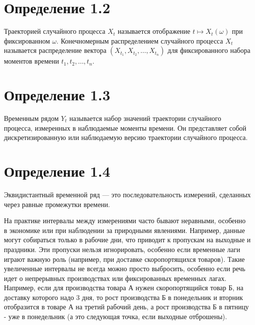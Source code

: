 \section*{Определение 1.2}
Траекторией случайного процесса \( X_t \)
называется отображение \( t \mapsto X_t(\omega) \) при
фиксированном \( \omega \).
Конечномерным распределением случайного процесса \( X_t \)
называется распределение вектора \( (X_{t_1}, X_{t_2}, \ldots,
X_{t_n}) \) для фиксированного набора моментов
времени \( t_1, t_2, \ldots, t_n \).

\section*{Определение 1.3} Временным рядом \( Y_t \) называется
набор значений траектории случайного процесса,
измеренных в наблюдаемые моменты времени. Он представляет собой
дискретизированную или наблюдаемую версию траектории случайного процесса.

\section*{Определение 1.4}
Эквидистантный временной ряд — это последовательность измерений,
сделанных через равные промежутки времени.

На практике интервалы между измерениями часто бывают неравными, особенно в
экономике или при наблюдении за природными явлениями. Например,
данные могут собираться только в рабочие дни, что приводит к
пропускам на выходные и праздники. Эти пропуски нельзя
игнорировать, особенно если временные лаги играют важную роль
(например, при доставке скоропортящихся товаров).
Такие увеличенные интервалы не всегда можно просто выбросить, особенно
если речь идет о непрерывных производствах или фиксированных временных лагах.
Например, если для производства товара А нужен скоропортящийся
товар Б, на доставку которого надо 3 дня, то рост производства Б в
понедельник и вторник отобразится в товаре А на третий рабочий
день, а рост производства Б в пятницу - уже в понедельник (а это
следующая точка, если выходные отброшены).

